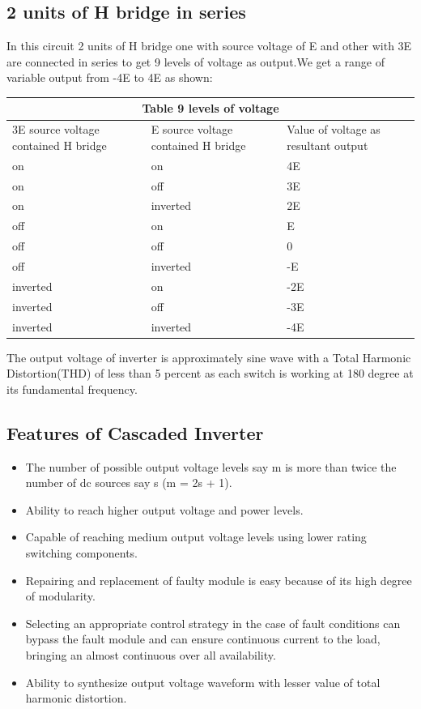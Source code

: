 \subsection{2 units of H bridge in series}
In this circuit 2 units of H bridge one with source voltage of E and other with 3E are connected in series to get 9 levels of voltage as output.We get a range of variable output from -4E to 4E as shown:\\
 \begin{center}
	\begin{tabular}{ |p{4cm}||p{4cm}|p{4cm}|  }
		\hline
		\multicolumn{3}{|c|}{Table 9 levels of voltage} \\
		\hline
		3E source voltage contained H bridge&E source voltage contained H bridge&Value of voltage as resultant output\\
		\hline
		on & on & 4E\\
		on & off & 3E\\
		on & inverted & 2E\\
		off & on & E\\
		off & off & 0\\
		off & inverted & -E\\
		inverted & on & -2E\\
		inverted & off & -3E\\
		inverted & inverted & -4E\\
		\hline
	\end{tabular}
\end{center}
The output voltage of inverter is approximately sine wave with a Total Harmonic Distortion(THD) of less than 5 percent as each switch is working at 180 degree at its fundamental frequency.
\subsection{Features of Cascaded Inverter}
\begin{itemize}
\item The number of possible output voltage levels say m is more than twice the number of dc sources say s (m = 2s + 1).
\item Ability to reach higher output voltage and power levels.
\item Capable of reaching medium output voltage levels using lower rating switching components.
\item Repairing and replacement of faulty module is easy because of its high degree of modularity.
\item Selecting an appropriate control strategy in the case of fault conditions can bypass the fault module and can ensure continuous current to the load, bringing an almost continuous over all availability.
\item Ability to synthesize output voltage waveform with lesser value of total harmonic distortion.
\end{itemize}

